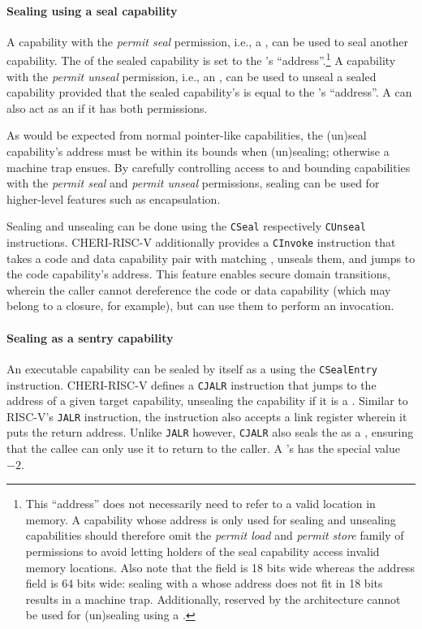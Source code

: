 \documentclass[main.tex]{subfiles}
\begin{document}
\paragraph{Sealing using a seal capability} A capability with the \emph{permit seal} permission, i.e., a \textbf{}, can be used to seal another capability. The  of the sealed capability is set to the 's \enquote{address}.\footnote{This \enquote{address} does not necessarily need to refer to a valid location in memory. A capability whose address is only used for sealing and unsealing capabilities should therefore omit the \emph{permit load} and \emph{permit store} family of permissions to avoid letting holders of the seal capability access invalid memory locations. Also note that the  field is 18 bits wide whereas the address field is 64 bits wide: sealing with a  whose address does not fit in 18 bits results in a machine trap. Additionally,  reserved by the architecture cannot be used for (un)sealing using a .} A capability with the \emph{permit unseal} permission, i.e., an \textbf{}, can be used to unseal a sealed capability provided that the sealed capability's  is equal to the 's \enquote{address}. A  can also act as an  if it has both permissions.

As would be expected from normal pointer-like capabilities, the (un)seal capability's address must be within its bounds when (un)sealing; otherwise a machine trap ensues. By carefully controlling access to and bounding capabilities with the \emph{permit seal} and \emph{permit unseal} permissions, sealing can be used for higher-level features such as encapsulation.

Sealing and unsealing can be done using the \texttt{CSeal} respectively \texttt{CUnseal} instructions. CHERI-RISC-V additionally provides a \texttt{CInvoke} instruction that takes a code and data capability pair with matching , unseals them, and jumps to the code capability's address. This feature enables secure domain transitions, wherein the caller cannot dereference the code or data capability (which may belong to a closure, for example), but can use them to perform an invocation.

\paragraph{Sealing as a sentry capability} An executable capability can be sealed by itself as a \textbf{} using the \texttt{CSealEntry} instruction. CHERI-RISC-V defines a \texttt{CJALR} instruction that jumps to the address of a given target capability, unsealing the capability if it is a . Similar to RISC-V's \texttt{JALR} instruction, the instruction also accepts a link register wherein it puts the return address. Unlike \texttt{JALR} however, \texttt{CJALR} also seals the  as a , ensuring that the callee can only use it to return to the caller. A 's  has the special value $-2$.

\biblio{}
\onlyinsubfile{\glsaddall\printglossaries}
\end{document}
